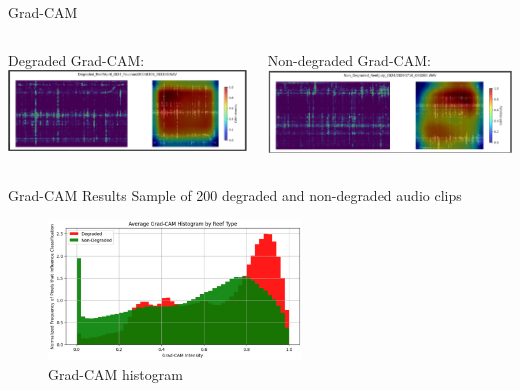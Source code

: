 \begin{frame}{Grad-CAM}
    \begin{columns}
        \begin{column}{0.5\textwidth}
            Degraded Grad-CAM:
            \includegraphics[height=1.0\textheight,width=1.0\textwidth,keepaspectratio]{images/degraded_grad_cam.png}
        \end{column}
        \begin{column}{0.5\textwidth}
            Non-degraded Grad-CAM:
            \includegraphics[height=1.0\textheight,width=1.0\textwidth,keepaspectratio]{images/non_degraded_grad_cam.png}
        \end{column}
    \end{columns}
\end{frame}

\begin{frame}{Grad-CAM Results}
    Sample of 200 degraded and non-degraded audio clips
    \begin{figure}
        \centering
        \includegraphics[height=0.6\textheight,width=0.6\textwidth,keepaspectratio]{images/grad_cam_histogram.png}
        \caption{Grad-CAM histogram}
    \end{figure}
\end{frame}

